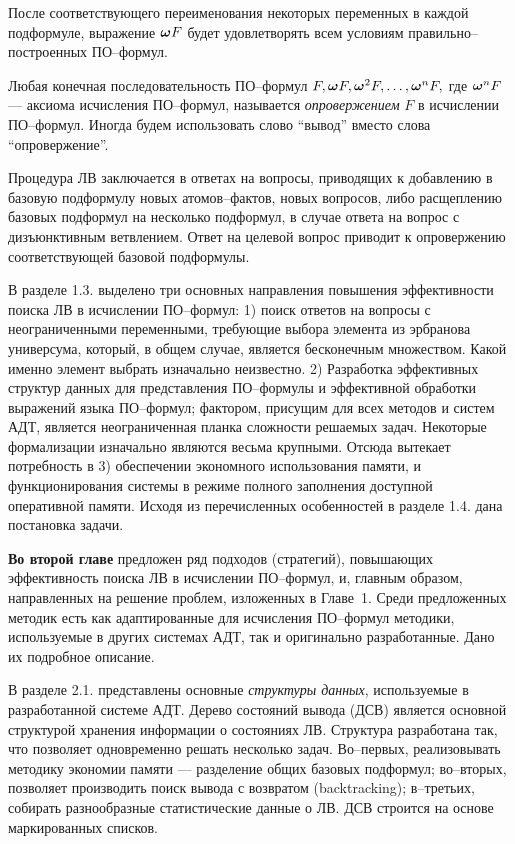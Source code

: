 \documentclass[a4paper]{report}
\begin{document}
После соответствующего переименования некоторых переменных в каждой подформуле, выражение $\boldsymbol{\omega} F$ будет удовлетворять всем условиям правильно--построенных ПО--формул.

Любая конечная последовательность ПО--формул $F, \boldsymbol{\omega} F, \boldsymbol{\omega}^2 F,\ldots,\boldsymbol{\omega}^n F,$ где $\boldsymbol{\omega}^n F$ --- аксиома исчисления ПО--формул, называется {\em опровержением} $F$ в исчислении ПО--формул. Иногда будем использовать слово ``вывод'' вместо слова ``опровержение''.

Процедура ЛВ заключается в ответах на вопросы, приводящих к добавлению в базовую подформулу новых атомов--фактов, новых вопросов, либо расщеплению базовых подформул на несколько подформул, в случае ответа на вопрос с дизъюнктивным ветвлением. Ответ на целевой вопрос приводит к опровержению соответствующей базовой подформулы.


В разделе 1.3. выделено три основных направления повышения эффективности поиска ЛВ в исчислении ПО--формул: 1) поиск ответов на вопросы с неограниченными переменными, требующие выбора элемента из эрбранова универсума, который, в общем случае, является бесконечным множеством. Какой именно элемент выбрать изначально неизвестно. 2) Разработка эффективных структур данных для представления ПО--формулы и эффективной обработки выражений языка ПО--формул; фактором, присущим для всех методов и систем АДТ, является неограниченная планка сложности решаемых задач. Некоторые формализации изначально являются весьма крупными. Отсюда вытекает потребность в 3) обеспечении экономного использования памяти, и функционирования системы в режиме полного заполнения доступной оперативной памяти. Исходя из перечисленных особенностей в разделе 1.4. дана постановка задачи.

\textbf{Во второй главе} предложен ряд подходов (стратегий), повышающих эффективность поиска ЛВ в исчислении ПО--формул, и, главным образом, направленных на решение проблем, изложенных в Главе~1. Среди предложенных методик есть как адаптированные для исчисления ПО--формул методики, используемые в других системах АДТ, так и оригинально разработанные. Дано их подробное описание.

В разделе 2.1. представлены основные \emph{структуры данных}, используемые в разработанной системе АДТ. Дерево состояний вывода (ДСВ) является основной структурой хранения информации о состояниях ЛВ. Структура разработана так, что позволяет одновременно решать несколько задач. Во--первых, реализовывать методику экономии памяти --- разделение общих базовых подформул; во--вторых, позволяет производить поиск вывода с возвратом (backtracking); в--третьих, собирать разнообразные статистические данные о ЛВ. ДСВ строится на основе маркированных списков.
\end{document}
